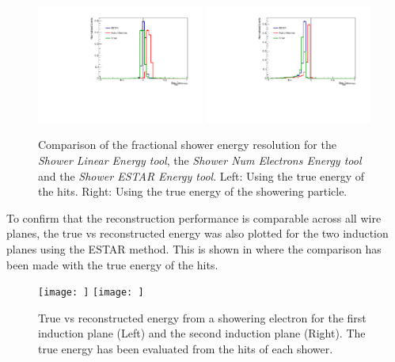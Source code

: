\begin{figure}[h!]
    \centering
    \includegraphics[width = 0.49\textwidth]{figures-chap4/bias_cheat_plane_2_all.pdf}
    \includegraphics[width = 0.49\textwidth]{figures-chap4/bias_cheat_plane_2_all_showeringE.pdf}
    \caption[Comparison of the fractional shower energy resolution.]{Comparison of the fractional shower energy resolution for the \textit{Shower Linear Energy tool}, the \textit{Shower Num Electrons Energy tool} and the \textit{Shower ESTAR Energy tool}. Left: Using the true energy of the hits. Right: Using the true energy of the showering particle.}
    \label{fig:fractional_energy_resolution}
\end{figure}

To confirm that the reconstruction performance is comparable across all wire planes, the true vs reconstructed energy was also plotted for the two induction planes using the ESTAR method. This is shown in  where the comparison has been made with the true energy of the hits.

\begin{figure}
    \centering
    \texttt{[image: ]}
    \texttt{[image: ]}
    \caption[True vs reconstructed energy from a showering electron for the two induction planes. The true energy has been evaluated from the hits of each shower.]{True vs reconstructed energy from a showering electron for the first induction plane (Left) and the second induction plane (Right). The true energy has been evaluated from the hits of each shower.}
    \label{fig:true_vs_reco_for_induction_planes}
\end{figure}

